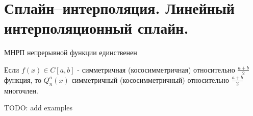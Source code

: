 \section{Сплайн–интерполяция. Линейный интерполяционный сплайн.}
\begin{example}

\end{example}
\begin{theorem}
  МНРП непрерывной функции единственен
\end{theorem}
\begin{corollary}
  Если $f(x)\in C[a,b]$ - симметричная (кососимметричная) относительно $\frac{a+b}{2}$ функция, то
  $Q_n^o(x)$ симметричный (кососимметричный) относительно $\frac{a+b}{2}$ многочлен.
\end{corollary}

TODO: add examples
